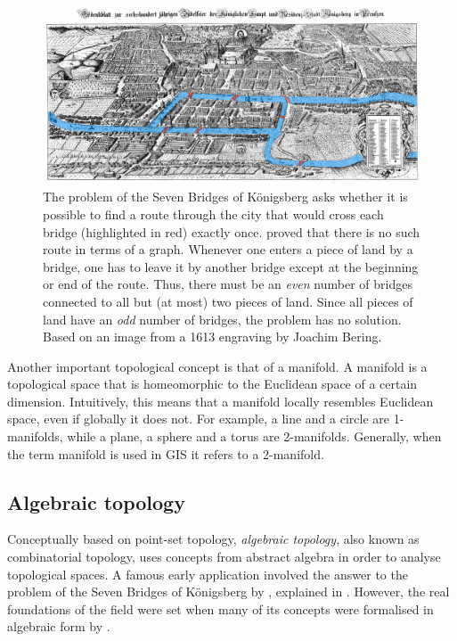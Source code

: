 
\begin{figure}[tbp]
\centering
\includegraphics[width=\linewidth]{figs/konigsberg}
\caption[The Seven Bridges of K\"onigsberg]{The problem of the Seven Bridges of K\"onigsberg asks whether it is possible to find a route through the city that would cross each bridge (highlighted in red) exactly once. \citet{Euler41} proved that there is no such route in terms of a graph. Whenever one enters a piece of land by a bridge, one has to leave it by another bridge except at the beginning or end of the route. Thus, there must be an \emph{even} number of bridges connected to all but (at most) two pieces of land. Since all pieces of land have an \emph{odd} number of bridges, the problem has no solution. Based on an image from a 1613 engraving by Joachim Bering.}
\label{fig:konigsberg}
\end{figure}

Another important topological concept is that of a manifold.
A manifold is a topological space that is homeomorphic to the Euclidean space of a certain dimension.
Intuitively, this means that a manifold locally resembles Euclidean space, even if globally it does not.
For example, a line and a circle are 1-manifolds, while a plane, a sphere and a torus are 2-manifolds.
Generally, when the term manifold is used in GIS it refers to a 2-manifold.

\subsection{Algebraic topology}
\label{ss:algebraic-topology}

Conceptually based on point-set topology, \emph{algebraic topology}, also known as combinatorial topology, uses concepts from abstract algebra in order to analyse topological spaces.
A famous early application involved the answer to the problem of the Seven Bridges of K\"onigsberg by \citet{Euler41}, explained in .
However, the real foundations of the field were set when many of its concepts were formalised in algebraic form by \citet{Poincare95}.

